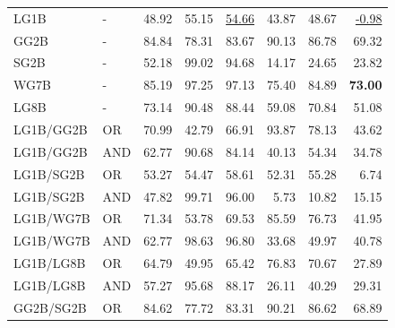 \documentclass{article}
\begin{document}
{\begin{longtable}{llrrrrrr}
LG1B                     & -       & 48.92             & 55.15             & \underline{54.66} & 43.87            & 48.67            & \underline{-0.98} \\
 GG2B                     & -       & 84.84             & 78.31             & 83.67             & 90.13            & 86.78            & 69.32             \\
 SG2B                     & -       & 52.18             & 99.02             & 94.68             & 14.17            & 24.65            & 23.82             \\
 WG7B                     & -       & 85.19             & 97.25             & 97.13             & 75.40            & 84.89            & \textbf{73.00}    \\
 LG8B                     & -       & 73.14             & 90.48             & 88.44             & 59.08            & 70.84            & 51.08             \\
 LG1B/GG2B                & OR      & 70.99             & 42.79             & 66.91             & 93.87            & 78.13            & 43.62             \\
 LG1B/GG2B                & AND     & 62.77             & 90.68             & 84.14             & 40.13            & 54.34            & 34.78             \\
 LG1B/SG2B                & OR      & 53.27             & 54.47             & 58.61             & 52.31            & 55.28            & 6.74              \\
 LG1B/SG2B                & AND     & 47.82             & 99.71             & 96.00             & 5.73             & 10.82            & 15.15             \\
 LG1B/WG7B                & OR      & 71.34             & 53.78             & 69.53             & 85.59            & 76.73            & 41.95             \\
 LG1B/WG7B                & AND     & 62.77             & 98.63             & 96.80             & 33.68            & 49.97            & 40.78             \\
 LG1B/LG8B                & OR      & 64.79             & 49.95             & 65.42             & 76.83            & 70.67            & 27.89             \\
 LG1B/LG8B                & AND     & 57.27             & 95.68             & 88.17             & 26.11            & 40.29            & 29.31             \\
 GG2B/SG2B                & OR      & 84.62             & 77.72             & 83.31             & 90.21            & 86.62            & 68.89             \\

\end{longtable}}
\end{document}
